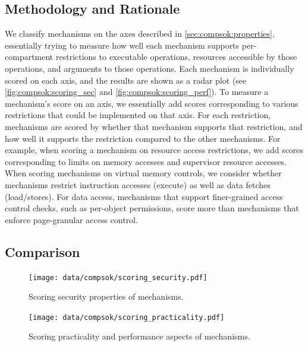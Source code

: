 \subsection{Methodology and Rationale}
\label{sec:compsok:methodology}
We classify mechanisms on the axes described in 
\autoref{sec:compsok:properties}, essentially trying to measure how well 
each mechanism supports per-compartment restrictions to executable operations,
resources accessible by those operations, and arguments to those operations.
Each mechanism is individually scored on each axis, and the results are shown
as a radar plot (see \autoref{fig:compsok:scoring_sec} and 
\autoref{fig:compsok:scoring_perf}).
To measure a mechanism's score on an axis, we essentially add scores 
corresponding to various restrictions that could be implemented on that axis.
For each restriction, mechanisms are scored by whether that mechanism supports
that restriction, and how well it supports the restriction compared to the 
other mechanisms.
For example, when scoring a mechanism on resource access restrictions, we
add scores corresponding to limits on memory accesses and supervisor resource
accesses.
When scoring mechanisms on virtual memory controls, we consider whether
mechanisms restrict instruction accesses (execute) as well as 
data fetches (load/stores).
For data access, mechanisms that support finer-grained access control checks, 
such as per-object permissions, score more than mechanisms that enforce 
page-granular access control.

\subsection{Comparison}
\label{sec:compsok:comparison}
\begin{figure}[ht]
  \centering
  \texttt{[image: data/compsok/scoring\_security.pdf]}
  \caption[Scoring security properties of mechanisms.]
          {Scoring security properties of mechanisms.}
  \label{fig:compsok:scoring_sec}
\end{figure}

\begin{figure}[t]
  \centering
  \texttt{[image: data/compsok/scoring\_practicality.pdf]}
  \caption[Scoring practicality and performance aspects of mechanisms.]
          {Scoring practicality and performance aspects of mechanisms.}
  \label{fig:compsok:scoring_perf}
\end{figure}


